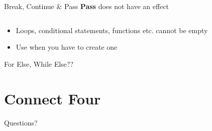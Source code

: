         \begin{frame}{Break, Continue \& Pass}
            \textbf{Pass}
            does not have an effect
            \bigskip  
            \inputminted[frame=single,framesep=2pt]{python3}{../Lecture3/code-examples/pass.py}
            \begin{itemize}
                \item Loops, conditional statements, functions etc. cannot be empty 
                \item Use when you have to create one
            \end{itemize}
        \end{frame}

        \begin{frame}{For Else, While Else??}
            
        \end{frame}

    \section{Connect Four}

        \begin{frame}{Questions?}
            
        \end{frame}

